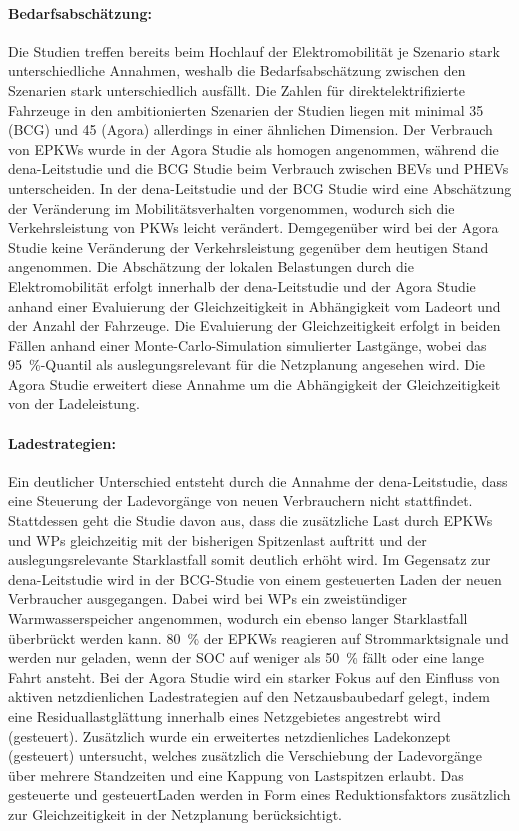 \paragraph{Bedarfsabschätzung:}

Die Studien treffen bereits beim Hochlauf der Elektromobilität je Szenario stark unterschiedliche Annahmen, weshalb die Bedarfsabschätzung zwischen den Szenarien stark unterschiedlich ausfällt.
Die Zahlen für direktelektrifizierte Fahrzeuge in den ambitionierten Szenarien der Studien liegen mit minimal \SI{35}{\MioFZs} (BCG) und \SI{45}{\MioFZs} (Agora) allerdings in einer ähnlichen Dimension.
Der Verbrauch von \glspl{EPKW} wurde in der Agora Studie als homogen angenommen, während die dena-Leitstudie und die BCG Studie beim Verbrauch zwischen \glspl{BEV} und \glspl{PHEV} unterscheiden.
In der dena-Leitstudie und der BCG Studie wird eine Abschätzung der Veränderung im Mobilitätsverhalten vorgenommen, wodurch sich die Verkehrsleistung von \glspl{PKW} leicht verändert.
Demgegenüber wird bei der Agora Studie keine Veränderung der Verkehrsleistung gegenüber dem heutigen Stand angenommen.
Die Abschätzung der lokalen Belastungen durch die Elektromobilität erfolgt innerhalb der dena-Leitstudie und der Agora Studie anhand einer Evaluierung der Gleichzeitigkeit in Abhängigkeit vom Ladeort und der Anzahl der Fahrzeuge.
Die Evaluierung der Gleichzeitigkeit erfolgt in beiden Fällen anhand einer Monte-Carlo-Simulation simulierter Lastgänge, wobei das \SI{95}{\percent}-Quantil als auslegungsrelevant für die Netzplanung angesehen wird.
Die Agora Studie erweitert diese Annahme um die Abhängigkeit der Gleichzeitigkeit von der Ladeleistung.


\paragraph{Ladestrategien:}

Ein deutlicher Unterschied entsteht durch die Annahme der dena-Leitstudie, dass eine Steuerung der Ladevorgänge von neuen Verbrauchern nicht stattfindet.
Stattdessen geht die Studie davon aus, dass die zusätzliche Last durch \glspl{EPKW} und \glspl{WP} gleichzeitig mit der bisherigen Spitzenlast auftritt und der auslegungsrelevante Starklastfall somit deutlich erhöht wird.
Im Gegensatz zur dena-Leitstudie wird in der BCG-Studie von einem gesteuerten Laden der neuen Verbraucher ausgegangen.
Dabei wird bei \glspl{WP} ein zweistündiger Warmwasserspeicher angenommen, wodurch ein ebenso langer Starklastfall überbrückt werden kann.
\SI{80}{\percent} der \glspl{EPKW} reagieren auf Strommarktsignale und werden nur geladen, wenn der \gls{SOC} auf weniger als \SI{50}{\percent} fällt oder eine lange Fahrt ansteht.
Bei der Agora Studie wird ein starker Fokus auf den Einfluss von aktiven netzdienlichen Ladestrategien auf den Netzausbaubedarf gelegt, indem eine Residuallastglättung innerhalb eines Netzgebietes angestrebt wird (gesteuert).
Zusätzlich wurde ein erweitertes netzdienliches Ladekonzept (gesteuert\Plusdot) untersucht, welches zusätzlich die Verschiebung der Ladevorgänge über mehrere Standzeiten und eine Kappung von Lastspitzen erlaubt.
Das gesteuerte und gesteuert\Plus Laden werden in Form eines Reduktionsfaktors zusätzlich zur Gleichzeitigkeit in der Netzplanung berücksichtigt.


